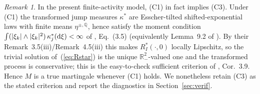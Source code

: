 \documentclass[11pt,a4paper]{article}
\numberwithin{equation}{section}
\theoremstyle{remark}
\newtheorem{remark}[theorem]{Remark}
\theoremstyle{definition}
\providecommand{\R}{{\mathbb{R}}}
\newcommand{\q}{{\mathbb Q}}
\newcommand{\dd}{{\rm d}}
\begin{document}
{\begin{remark}
  \label{remark:6.3}
In the present finite-activity model, \textup{(C1)} in fact implies
\textup{(C3)}. Under \textup{(C1)} the transformed jump measures
$\kappa^{*}$ are Esscher-tilted shifted-exponential laws with finite
means $\eta^{\pm,\q}$, hence satisfy the moment condition
$\int(\lvert\xi_k\rvert\wedge\lvert\xi_k\rvert^{2})\,\kappa^{*}_j(\dd\xi)<\infty$
of \cite{Mayerhofer2011}, Eq.~(3.5) (equivalently Lemma~9.2 of
\cite{Duffie2003a}). By their  Remark~3.5(iii)/Remark~4.5(iii) this
makes $R^{*}_{I}(\cdot,0)$ locally Lipschitz, so the trivial solution
of~(\ref{eq:Rstar}) is the unique $\R^{2}_{-}$-valued one and the
transformed process is conservative; this is the easy-to-check
sufficient criterion of \cite{Kallsen2010}, Cor.~3.9. Hence $M$
is a true martingale whenever \textup{(C1)} holds. We nonetheless retain \textup{(C3)} as the stated
criterion and report the diagnostics in Section~\ref{sec:verif}.
\end{remark}
}
\end{document}
